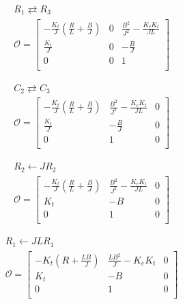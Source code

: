 \begin{equation*}
  \begin{aligned}
    &R_1 \rightleftarrows R_3\\
    &\mathcal{O} = 
    \begin{bmatrix}
    -\tfrac{K_t}{J}\left( \tfrac{R}{L} + \tfrac{B}{J} \right) & 0 & \tfrac{B^2}{J^2} - \tfrac{K_e K_t}{JL} \\
    \tfrac{K_t}{J}       & 0 & -\tfrac{B}{J} \\
    0                    & 0 & 1 \\
    \end{bmatrix}
  \end{aligned}
\end{equation*}

\begin{equation*}
  \begin{aligned}
    &C_2 \rightleftarrows C_3\\
    &\mathcal{O} = 
    \begin{bmatrix}
    -\tfrac{K_t}{J}\left( \tfrac{R}{L} + \tfrac{B}{J} \right) & \tfrac{B^2}{J^2} - \tfrac{K_e K_t}{JL} & 0 \\
    \tfrac{K_t}{J}       & -\tfrac{B}{J} & 0 \\
    0                    & 1 & 0 \\
    \end{bmatrix}
  \end{aligned}
\end{equation*}

\begin{equation*}
  \begin{aligned}
    &R_2\leftarrow J R_2\\
    &\mathcal{O} = 
    \begin{bmatrix}
    -\tfrac{K_t}{J}\left( \tfrac{R}{L} + \tfrac{B}{J} \right) & \tfrac{B^2}{J^2} - \tfrac{K_e K_t}{JL} & 0 \\
    K_t                  & -B                     & 0 \\
    0                    &  1                     & 0 \\
    \end{bmatrix}
  \end{aligned}
\end{equation*}

\begin{equation*}
  \begin{aligned}
    &R_1\leftarrow JL R_1\\
    &\mathcal{O} = 
    \begin{bmatrix}
    -K_t\left(R + \tfrac{LB}{J}\right) & \tfrac{LB^2}{J} - K_e K_t & 0 \\
    K_t                  & -B                     & 0 \\
    0                    &  1                     & 0 \\
    \end{bmatrix}
  \end{aligned}
\end{equation*}

